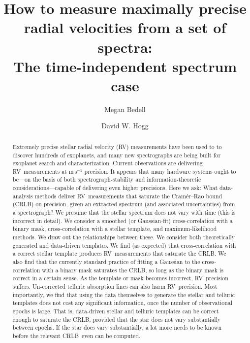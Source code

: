 \documentclass[modern]{aastex62}
\newcommand{\unit}[1]{\mathrm{#1}}
\newcommand{\m}{\unit{m}}
\newcommand{\s}{\unit{s}}
\newcommand{\mps}{\m\,\s^{-1}}
\newcommand{\acronym}[1]{{\small{#1}}}
\newcommand{\RV}{\acronym{RV}}
\newcommand{\CRLB}{\acronym{CRLB}}
\begin{document}
\sloppy\sloppypar\raggedbottom\frenchspacing %
\graphicspath{ {figures/} }

\title{\textbf{How to measure maximally precise radial velocities from a set of spectra:\\
               The time-independent spectrum case}}

\author[0000-0001-9907-7742]{Megan Bedell}

\author[0000-0003-2866-9403]{David W. Hogg}

\begin{abstract}\noindent
Extremely precise stellar radial velocity (\RV) measurements
have been used to to discover hundreds of exoplanets, and
many new spectrographs are being built for exoplanet search and
characterization.
Current observations are delivering \RV\ measurements at $\mps$
precision.
It appears that many hardware systems ought to be---on the basis of
both spectrograph-stability and information-theoretic
considerations---capable of delivering even higher precisions.
Here we ask: What data-analysis methods deliver \RV\ measurements that
saturate the Cram\'er--Rao bound (\CRLB) on precision, given an
extracted spectrum (and associated uncertainties) from a spectrograph?
We presume that the stellar spectrum does not vary with time (this is
incorrect in detail).
We consider a smoothed (or
Gaussian-fit) cross-correlation with a binary mask,
cross-correlation with a stellar template,
and maximum-likelihood methods.
We draw out the relationships between these.
We consider both theoretically generated and data-driven templates.
We find (as expected) that cross-correlation with a correct stellar
template produces \RV\ measurements that saturate the \CRLB.
We also find that 
the currently standard practice of fitting a Gaussian to the cross-correlation
with a binary mask saturates the \CRLB, so long as the binary mask is
correct in a certain sense.
As the template or mask becomes incorrect, \RV\ precision suffers.
Un-corrected telluric absorption lines can also harm \RV\ precision.
Most importantly, we find that using the data themselves to generate
the stellar and telluric templates does not cost any significant
information, once the number of observational epochs is large.
That is, data-driven stellar and telluric templates can be correct
enough to saturate the \CRLB, provided that
the star does not vary substantially between epochs.
If the star does vary substantially, a lot more needs to be known
before the relevant \CRLB\ even can be computed.
\end{abstract}
\end{document}
